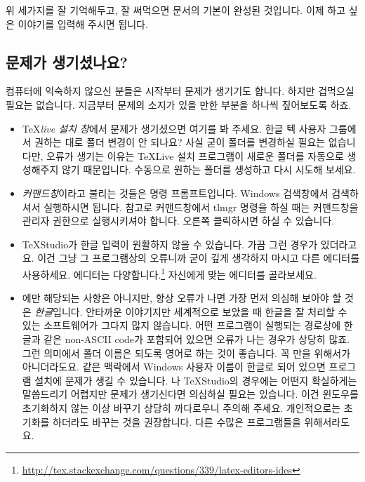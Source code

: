 위 세가지를 잘 기억해두고, 잘 써먹으면 \lt 문서의 기본이 완성된 것입니다. 이제 하고 싶은 이야기를 입력해 주시면 됩니다.

\subsection{문제가 생기셨나요?}
\label{sec2:problem}
컴퓨터에 익숙하지 않으신 분들은 시작부터 문제가 생기기도 합니다.
하지만 겁먹으실 필요는 없습니다.
지금부터 문제의 소지가 있을 만한 부분을 하나씩 짚어보도록 하죠.
\begin{itemize}
	\item \TeX \emph{live 설치 창}에서 문제가 생기셨으면 여기를 봐 주세요.
	한글 텍 사용자 그룹에서 권하는 대로 폴더 변경이 안 되나요?
	사실 굳이 폴더를 변경하실 필요는 없습니다만, 오류가 생기는 이유는 \TeX Live 설치 프로그램이 새로운 폴더를 자동으로 생성해주지 않기 때문입니다.
	수동으로 원하는 폴더를 생성하고 다시 시도해 보세요.
	
	\item \emph{커맨드창}이라고 불리는 것들은 명령 프롬프트입니다.
	Windows 검색창에서 검색하셔서 실행하시면 됩니다.
	참고로 커맨드창에서 tlmgr 명령을 하실 때는 커맨드창을 관리자 권한으로 실행시키셔야 합니다.
	오른쪽 클릭하시면 하실 수 있습니다.
	
	\item TeXStudio가 한글 입력이 원활하지 않을 수 있습니다.
	가끔 그런 경우가 있더라고요.
	이건 그냥 그 프로그램상의 오류니까 굳이 깊게 생각하지 마시고 다른 에디터를 사용하세요.
	에디터는 다양합니다.\footnote{\url{http://tex.stackexchange.com/questions/339/latex-editors-ides}}
	자신에게 맞는 에디터를 골라보세요.
	
	\item \lt 에만 해당되는 사항은 아니지만, 항상 오류가 나면 가장 먼저 의심해 보아야 할 것은 \emph{한글}입니다.
	안타까운 이야기지만 세계적으로 보았을 때 한글을 잘 처리할 수 있는 소프트웨어가 그다지 많지 않습니다.
	어떤 프로그램이 실행되는 경로상에 한글과 같은 non-ASCII code가 포함되어 있으면 오류가 나는 경우가 상당히 많죠.
	그런 의미에서 폴더 이름은 되도록 영어로 하는 것이 좋습니다. 꼭 \lt 만을 위해서가 아니더라도요.
	같은 맥락에서 Windows 사용자 이름이 한글로 되어 있으면 프로그램 설치에 문제가 생길 수 있습니다.
	\lt 나 TeXStudio의 경우에는 어떤지 확실하게는 말씀드리기 어렵지만 문제가 생기신다면 의심하실 필요는 있습니다.
	이건 윈도우를 초기화하지 않는 이상 바꾸기 상당히 까다로우니 주의해 주세요.
	개인적으로는 초기화를 하더라도 바꾸는 것을 권장합니다.
	다른 수많은 프로그램들을 위해서라도요.


\end{itemize}
